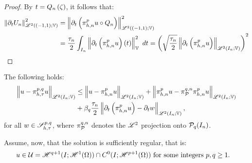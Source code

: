 \begin{proof}
    By $t = Q_n \left( \zeta \right)$, it follows that:
    \begin{align*}
        \left\lVert \partial_t U_n \right\rVert_{\mathscr{L}^{2}((-1, 1); \mathbb{V})}^2 &= \left\lVert \partial_t \left( \pi_{h, n}^p u \circ Q_n \right) \right\rVert_{\mathscr{L}^{2}((-1, 1); \mathbb{V})}^2 \\
        &= \frac{\tau_n}{2} \int_{I_n} \left\lVert  \partial_t \left( \pi_{h, n}^p u \right) (t)  \right\rVert_{\mathbb{V}}^2 ~ dt = \left( \sqrt{\frac{\tau_n}{2}} \left\lVert \partial_t \left( \pi_{h, n}^p u \right) \right\rVert_{\mathscr{L}^{2}(I_n; \mathbb{V})} \right)^2
    \end{align*}
\end{proof}

\newpage
\begin{lemma}
    The following holds:
    \begin{align}
        \left\lVert u - \pi_{h, \tau}^{p, q} u \right\rVert_{\mathscr{L}^{2}(I_n; \mathbb{V})} &\leq \left\lVert u - \pi_{h, n}^p u \right\rVert_{\mathscr{L}^{2}(I_n; \mathbb{V})} + \left\lVert \pi_{h, n}^p u - \pi_{\mathcal{P}_{}}^{q, n} \pi_{h, n}^p u \right\rVert_{\mathscr{L}^{2}(I_n; \mathbb{V})} \\
        &+ \beta_{q} \frac{\tau_n}{2} \left\lVert \partial_t \left( \pi_{h, n}^p u \right) - \partial_t w \right\rVert_{\mathscr{L}^{2}(I_n; \mathbb{V})}, \notag
    \end{align}
    for all $w \in \mathscr{S}^{p, q}_{h, \tau}$, where $\pi_{\mathcal{P}_{}}^{q, n}$ denotes the $\mathscr{L}^{2}$ projection onto $\mathcal{P}_{q}(I_n)$.
\end{lemma}

Assume, now, that the solution is sufficiently regular, that is:
\begin{align}
    u \in \mathcal{U} = \mathscr{H}^{q + 1}(I; \mathscr{H}^{1}(\Omega)) \cap C^0(I; \mathscr{H}^{p + 1}(\Omega)) &\text{ for some integers } p, q \geq 1.
\end{align}

